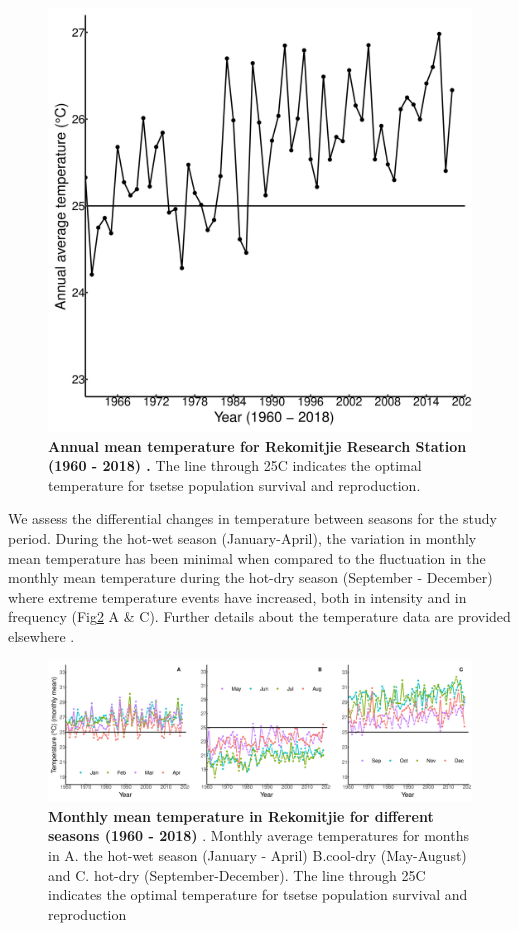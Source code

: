 \documentclass[12pt,a4paper]{article}
\begin{document}
\begin{figure}[hbt!]
	\centering
	\includegraphics[width=0.7\linewidth]{20April20AnnualAverageTemp1960to2018}
	\caption{{\bf Annual mean temperature for Rekomitjie Research Station (1960 - 2018) .} The line through 25\degree C indicates the optimal temperature for tsetse population survival and reproduction.}
	\label{fig:AnnualAveTem}
\end{figure}


\newpage
We assess the differential changes in temperature between seasons for the study period. During the hot-wet season (January-April), the variation in monthly mean temperature has been minimal when compared to the fluctuation in the monthly mean temperature during the hot-dry season (September - December) where extreme temperature events have increased, both in intensity and in frequency  (Fig\ref{fig:combineTem} A \& C). Further details about the temperature data are provided elsewhere \cite{Lord2018}.     


\begin{figure}[hbt!]
	\centering
	\includegraphics[width=1.1\linewidth]{21April20CombineTemPlot}
	\caption{{\bf Monthly mean temperature in Rekomitjie for different seasons (1960 - 2018) }. Monthly average temperatures for months in A. the hot-wet season (January - April)  B.cool-dry (May-August) and C. hot-dry (September-December). The line through 25\degree C indicates the optimal temperature for tsetse population survival and reproduction}
	\label{fig:combineTem}
\end{figure}
\end{document}
